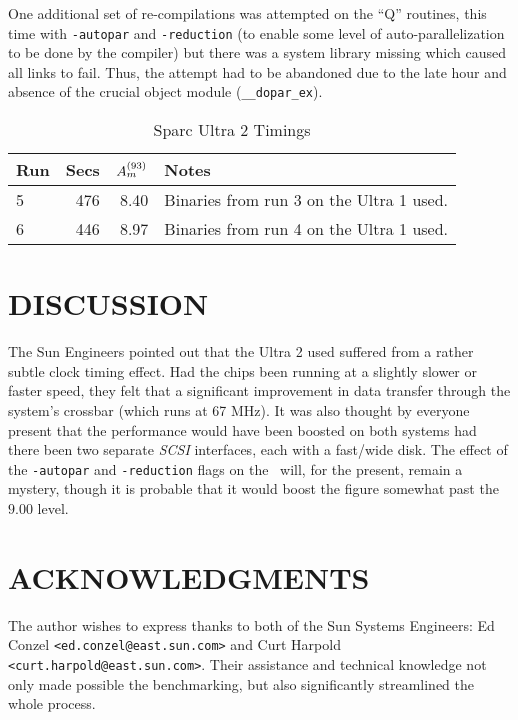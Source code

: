      One additional set of re-compilations was attempted on the ``Q''
routines, this time with {\tt -autopar} and {\tt -reduction} (to enable
some level of auto-parallelization to be done by the compiler) but there
was a system library missing which caused all links to fail.  Thus, the
attempt had to be abandoned due to the late hour and absence of the
crucial object module ({\tt \_\_dopar\_ex}).

\begin{table}
\protect\begin{center}
\protect\begin{tabular}{|l|r|r|l|} \hline
Run & Secs & $A_m^{(93)} $ & Notes \\ \hline
5 & 476 & 8.40 & Binaries from run 3 on the Ultra 1 used. \\
6 & 446 & 8.97 & Binaries from run 4 on the Ultra 1 used. \\
\hline
\end{tabular}
\end{center}
\caption{Sparc Ultra 2 Timings}
\label{ta:two} %
\end{table}

\section{DISCUSSION}

     The Sun Engineers pointed out that the Ultra 2 used suffered from a
rather subtle clock timing effect.  Had the chips been running at a
slightly slower or faster speed, they felt that a significant improvement
in data transfer through the system's crossbar (which runs at 67 MHz).  It
was also thought by everyone present that the performance would have been
boosted on both systems had there been two separate {\it SCSI\/}
interfaces, each with a fast/wide disk.  The effect of the {\tt -autopar}
and {\tt -reduction} flags on the \AMark\ will, for the present, remain a
mystery, though it is probable that it would boost the figure
somewhat past the $9.00$ level.


\section{ACKNOWLEDGMENTS}

     The author wishes to express thanks to both of the Sun Systems
Engineers: Ed Conzel {\tt <ed.conzel@east.sun.com>} and Curt Harpold {\tt
<curt.harpold@east.sun.com>}.  Their assistance and technical knowledge
not only made possible the benchmarking, but also significantly
streamlined the whole process.


